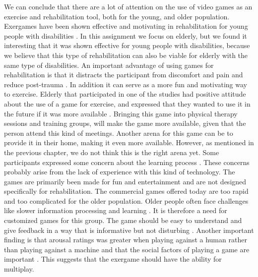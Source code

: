 We can conclude that there are a lot of attention on the use of video games as an exercise and rehabilitation tool, both for the young, and older population. Exergames have been shown effective and motivating in rehabilitation for young people with disabilities \cite{kinect}. In this assignment we focus on elderly, but we found it interesting that it was shown effective for young people with disabilities, because we believe that  this type of rehabilitation can also be viable for elderly with the same type of disabilities. An important advantage of using games for rehabilitation is that it distracts the participant from discomfort and pain and reduce post-trauma  \cite{roleofvideogames}. In addition it can serve as a more fun and motivating way to exercise. Elderly that participated in one of the studies had positive attitude about the use of a game for exercise, and expressed that they wanted to use it in the future if it was more available \cite{excell}. Bringing this game into physical therapy sessions and training groups, will make the game more available, given that the  person attend this kind of meetings. Another arena for this game can be to provide it in their home, making it even more available. However, as mentioned in the previous chapter, we do not think this is the right arena yet.  Some participants  expressed some concern about the learning process \cite{taylor2011activity}. These concerns probably arise from the lack of experience with this kind of technology.  The games are primarily been made for fun and entertainment and are not designed specifically for rehabilitation.  The commercial games offered today are too rapid and too complicated for the older population. Older people often face challenges like slower information processing and learning \cite{exergamesforelderly}. It is therefore a need for customized games for this group. The game should be easy to understand and give feedback in a way that is informative but not disturbing \cite{exergamesforelderly}. Another important finding is that arousal ratings was greater when playing against a human rather than playing against a machine and that the social factors of playing a game are important \cite{exergamesforelderly} \cite{taylor2011activity}. This suggests that the exergame should have the ability for multiplay.  \\ \\
